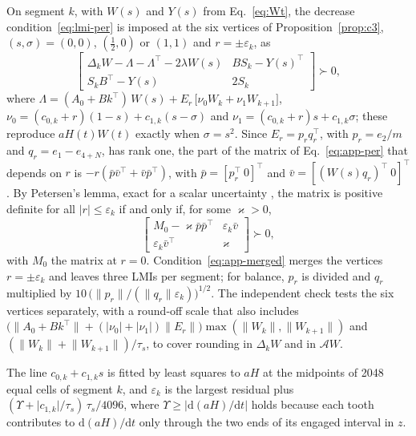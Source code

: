 On segment $k$, with $W(s)$ and $Y(s)$ from Eq.~\eqref{eq:Wt}, the decrease condition~\eqref{eq:lmi-per} is imposed at the six vertices of Proposition~\ref{prop:c3}, $(s,\sigma)=(0,0)$, $(\tfrac12,0)$ or $(1,1)$ and $r=\pm\varepsilon_k$, as
\begin{equation}\label{eq:app-per}
\begin{bmatrix}\Delta_kW-\Lambda-\Lambda^\top-2\lambda W(s) & BS_k-Y(s)^\top\\ S_kB^\top-Y(s) & 2S_k\end{bmatrix}\succ0,
\end{equation}
where $\Lambda=(A_0+Bk^\top)\,W(s)+E_r\,\big[\nu_0W_k+\nu_1W_{k+1}\big]$, $\nu_0=(c_{0,k}+r)(1-s)+c_{1,k}(s-\sigma)$ and $\nu_1=(c_{0,k}+r)s+c_{1,k}\sigma$; these reproduce $aH(t)W(t)$ exactly when $\sigma=s^2$. Since $E_r=p_rq_r^\top$, with $p_r=e_2/m$ and $q_r=e_1-e_{4+N}$, has rank one, the part of the matrix of Eq.~\eqref{eq:app-per} that depends on $r$ is $-r(\bar p\bar v^\top+\bar v\bar p^\top)$, with $\bar p=[p_r^\top\ 0]^\top$ and $\bar v=[(W(s)q_r)^\top\ 0]^\top$. By Petersen's lemma, exact for a scalar uncertainty \citep{petersen1987stabilization}, the matrix is positive definite for all $\lvert r\rvert\le\varepsilon_k$ if and only if, for some $\varkappa>0$,
\begin{equation}\label{eq:app-merged}
\begin{bmatrix}M_0-\varkappa\bar p\bar p^\top & \varepsilon_k\bar v\\ \varepsilon_k\bar v^\top & \varkappa\end{bmatrix}\succ0,
\end{equation}
with $M_0$ the matrix at $r=0$. Condition~\eqref{eq:app-merged} merges the vertices $r=\pm\varepsilon_k$ and leaves three LMIs per segment; for balance, $p_r$ is divided and $q_r$ multiplied by $10\,\big(\lVert p_r\rVert/(\lVert q_r\rVert\varepsilon_k)\big)^{1/2}$. The independent check tests the six vertices separately, with a round-off scale that also includes $\big(\lVert A_0+Bk^\top\rVert+(\lvert\nu_0\rvert+\lvert\nu_1\rvert)\lVert E_r\rVert\big)\max(\lVert W_k\rVert,\lVert W_{k+1}\rVert)$ and $(\lVert W_k\rVert+\lVert W_{k+1}\rVert)/\tau_s$, to cover rounding in $\Delta_kW$ and in $\mathcal AW$.

The line $c_{0,k}+c_{1,k}s$ is fitted by least squares to $aH$ at the midpoints of 2048 equal cells of segment $k$, and $\varepsilon_k$ is the largest residual plus $(\Upsilon+\lvert c_{1,k}\rvert/\tau_s)\,\tau_s/4096$, where $\Upsilon\ge\lvert\mathrm d(aH)/\mathrm dt\rvert$ holds because each tooth contributes to $\mathrm d(aH)/\mathrm dt$ only through the two ends of its engaged interval in $z$.

